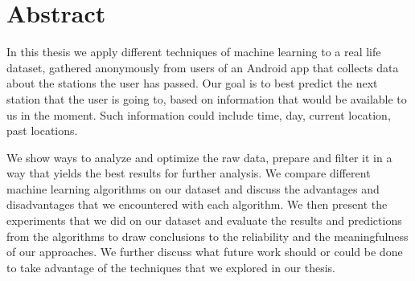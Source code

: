 \newpage
\section{Abstract}

In this thesis we apply different techniques of machine learning to a real life dataset, gathered anonymously from users of an Android app that collects data about the stations the user has passed. Our goal is to best predict the next station that the user is going to, based on information that would be available to us in the moment. Such information could include time, day, current location, past locations.

We show ways to analyze and optimize the raw data, prepare and filter it in a way that yields the best results for further analysis. We compare different machine learning algorithms on our dataset and discuss the advantages and disadvantages that we encountered with each algorithm. We then present the experiments that we did on our dataset and evaluate the results and predictions from the algorithms to draw conclusions to the reliability and the meaningfulness of our approaches. We further discuss what future work should or could be done to take advantage of the techniques that we explored in our thesis.
